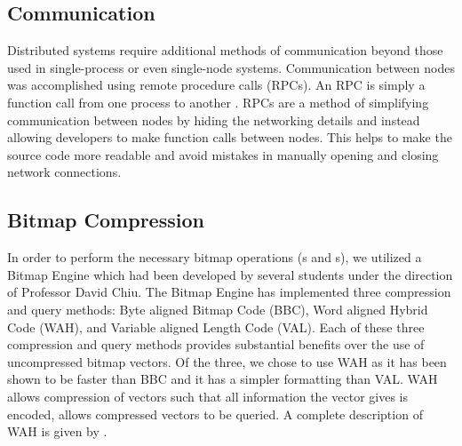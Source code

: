 \subsection{Communication}
Distributed systems require additional methods of communication beyond those used in single-process or even single-node systems.
Communication between nodes was accomplished using remote procedure calls (RPCs). An RPC is simply a function call
from one process to another \cite{tanenbaum1994}.
RPCs are a method of simplifying communication between nodes by hiding the networking details and instead allowing developers to make function calls between nodes.
This helps to make the source code more readable and avoid mistakes in manually opening and closing network connections.

%
\subsection{Bitmap Compression}
In order to perform the necessary bitmap operations (s and s), we utilized a Bitmap Engine which had been developed by several students under the direction of Professor David Chiu.
The Bitmap Engine has implemented three compression and query methods: Byte aligned Bitmap Code (BBC), Word aligned Hybrid Code (WAH), and Variable aligned Length Code (VAL).
Each of these three compression and query methods provides substantial benefits over the use of uncompressed bitmap vectors.
Of the three, we chose to use WAH as it has been shown to be faster than BBC and it has a simpler formatting than VAL.
WAH allows compression of vectors such that all information the vector gives
is encoded, allows compressed vectors to be queried. A complete description of
WAH is given by \cite{}.
%
